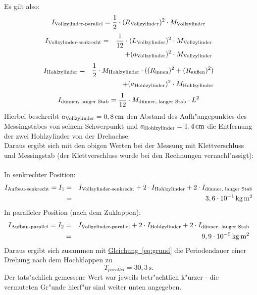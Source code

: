 \documentclass[11pt]{scrartcl}
\newcommand{\unit}[1]{\ensuremath{\,\mathrm{#1}}} %
\newcommand{\ee}[1]{\ensuremath{\cdot 10^{#1}}}
\newcommand{\ltext}[1]{\ensuremath{_{\textnormal{#1}}}}
\newcommand{\hypref}[2]{\hyperref[#2]{{#1}~\ref{#2}}}
\begin{document}
\noindent
Es gilt also:
\begin{equation}
I\ltext{Vollzylinder-parallel}
=\frac{1}{2} \cdot (R\ltext{Vollzylinder})^2 \cdot M\ltext{Vollzylinder}
\end{equation}
\begin{eqnarray}
I\ltext{Vollzylinder-senkrecht}
&=& \frac{1}{12} \cdot (L\ltext{Vollzylinder})^2 \cdot M\ltext{Vollzylinder}\nonumber\\
&& + (a\ltext{Vollzylinder})^2 \cdot M\ltext{Vollzylinder}
\end{eqnarray}
\begin{eqnarray}
I\ltext{Hohlzylinder}
&=&\frac{1}{2} \cdot M\ltext{Hohlzylinder} \cdot ((R\ltext{innen})^2+(R\ltext{außen})^2)\nonumber\\
&& +(a\ltext{Hohlzylinder})^2 \cdot M\ltext{Hohlzylinder}
\end{eqnarray}
\begin{equation}
I\ltext{dünner, langer Stab}
=\frac{1}{12} \cdot M\ltext{dünner, langer Stab} \cdot L^2
\end{equation}
Hierbei beschreibt $ a\ltext{Vollzylinder} = 0,8 \unit{cm} $ den Abstand des Aufh"angepunktes des Messingstabes von seinem Schwerpunkt und $ a\ltext{Hohlzylinder} = 1,4 \unit{cm} $ die Entfernung der zwei Hohlzylinder von der Drehachse.\\
Daraus ergibt sich mit den obigen Werten bei der Messung mit Klettverschluss und Messingstab (der Klettverschluss wurde bei den Rechnungen vernachl"assigt):\\
\\
In senkrechter Position:
\begin{eqnarray}
I\ltext{Aufbau-senkrecht}=I_1
&=&
I\ltext{Vollzylinder-senkrecht}+2 \cdot I\ltext{Hohlzylinder} + 2 \cdot I\ltext{dünner, langer Stab}\nonumber\\
&=& 3,6 \ee{-1} \unit{kg} \unit{m^2}
\end{eqnarray}
In paralleler Position (nach dem Zuklappen):
\begin{eqnarray}
I\ltext{Aufbau-parallel}=I_2
&=& I\ltext{Vollzylinder-parallel}+2 \cdot I\ltext{Hohlzylinder} + 2 \cdot I\ltext{dünner, langer Stab}\nonumber\\
&=& 9,9 \ee{-5} \unit{kg} \unit{m^2}
\end{eqnarray}
Daraus ergibt sich zusammen mit \hypref{Gleichung}{eq:grund}
die Periodendauer einer Drehung nach dem Hochklappen zu
\begin{equation}
\label{eq:tpara}
T_{parallel}=30,3 \unit{s}.
\end{equation}
Der tats"achlich gemessene Wert war jeweils betr"achtlich k"urzer - die vermuteten Gr"unde hierf"ur sind weiter unten angegeben.
\end{document}
